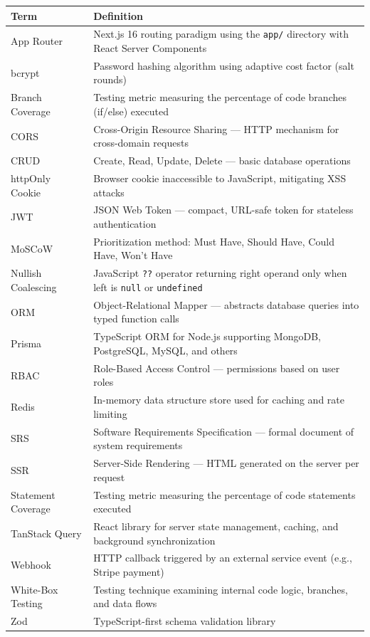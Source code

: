 ﻿\documentclass[12pt,a4paper]{report}
\begin{document}
\begin{center}
\begin{longtable}{lp{10cm}}
  \toprule
  \textbf{Term} & \textbf{Definition} \\
  \midrule
  \endhead
  App Router       & Next.js 16 routing paradigm using the \texttt{app/} directory with React Server Components \\
  bcrypt           & Password hashing algorithm using adaptive cost factor (salt rounds) \\
  Branch Coverage  & Testing metric measuring the percentage of code branches (if/else) executed \\
  CORS             & Cross-Origin Resource Sharing --- HTTP mechanism for cross-domain requests \\
  CRUD             & Create, Read, Update, Delete --- basic database operations \\
  httpOnly Cookie  & Browser cookie inaccessible to JavaScript, mitigating XSS attacks \\
  JWT              & JSON Web Token --- compact, URL-safe token for stateless authentication \\
  MoSCoW           & Prioritization method: Must Have, Should Have, Could Have, Won't Have \\
  Nullish Coalescing & JavaScript \texttt{??} operator returning right operand only when left is \texttt{null} or \texttt{undefined} \\
  ORM              & Object-Relational Mapper --- abstracts database queries into typed function calls \\
  Prisma           & TypeScript ORM for Node.js supporting MongoDB, PostgreSQL, MySQL, and others \\
  RBAC             & Role-Based Access Control --- permissions based on user roles \\
  Redis            & In-memory data structure store used for caching and rate limiting \\
  SRS              & Software Requirements Specification --- formal document of system requirements \\
  SSR              & Server-Side Rendering --- HTML generated on the server per request \\
  Statement Coverage & Testing metric measuring the percentage of code statements executed \\
  TanStack Query   & React library for server state management, caching, and background synchronization \\
  Webhook          & HTTP callback triggered by an external service event (e.g., Stripe payment) \\
  White-Box Testing & Testing technique examining internal code logic, branches, and data flows \\
  Zod              & TypeScript-first schema validation library \\
  \bottomrule
\end{longtable}
\end{center}
\end{document}
